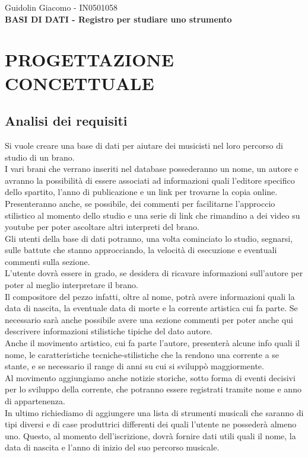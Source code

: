 \documentclass{article}
\begin{document}
    Guidolin Giacomo - IN0501058 \\


    \textbf{BASI DI DATI - Registro per studiare uno strumento}\\

    \section{PROGETTAZIONE CONCETTUALE }

    \subsection{Analisi dei requisiti}

    Si vuole creare una base di dati per aiutare dei musicisti nel loro percorso di studio di un brano.\\
    I vari brani che verrano inseriti nel database possederanno un nome, un autore e avranno la possibilità di essere associati ad informazioni quali l'editore specifico dello spartito,
    l'anno di publicazione e un link per trovarne la copia online. Presenteranno anche, se possibile, dei commenti per facilitarne l'approccio stilistico al momento dello studio e una serie
    di link che rimandino a dei video su youtube per poter ascoltare altri interpreti del brano.\\
    Gli utenti della base di dati potranno, una volta cominciato lo studio, segnarsi, sulle battute che stanno approcciando, la velocità di esecuzione e eventuali commenti sulla sezione.\\
    L'utente dovrà essere in grado, se desidera di ricavare informazioni sull'autore per poter al meglio interpretare il brano.\\
    Il compositore del pezzo infatti, oltre al nome, potrà avere informazioni quali la data di nascita, la eventuale data di morte e la corrente artistica cui fa parte. Se necessario sarà anche
    possibile avere una sezione commenti per poter anche qui descrivere informazioni stilistiche tipiche del dato autore.\\
    Anche il movimento artistico, cui fa parte l'autore, presenterà alcune info quali il nome, le caratteristiche tecniche-stilistiche che la rendono una corrente a se stante,
    e se necessario il range di anni su cui si sviluppò  maggiormente.
    \\Al movimento aggiungiamo anche notizie storiche, sotto forma di eventi decisivi per lo sviluppo della corrente, che potranno essere registrati tramite nome e anno di appartenenza.
    \\In ultimo richiediamo di aggiungere una lista di strumenti musicali che saranno di tipi diversi e di case produttrici differenti dei quali l'utente ne possederà almeno uno. Questo, al
    momento dell'iscrizione, dovrà fornire dati utili quali il nome, la data di nascita e l'anno di inizio del suo percorso musicale.\\
\end{document}
